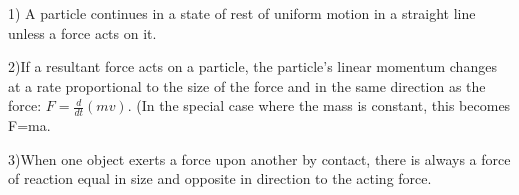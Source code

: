  1) A particle continues in a state of rest of uniform motion in a
straight line unless a force acts on it.
\par
2)If a resultant force acts on a particle, the particle's
linear momentum changes at a rate proportional to the size of the
force and in the same direction as the force: $ F = \frac{d}{dt}(mv) . $
(In the special case where the mass is constant, this becomes F=ma.
\par
3)When one object exerts a force upon another by contact, there is 
always a force of reaction equal in size and opposite in direction 
to the acting force.
